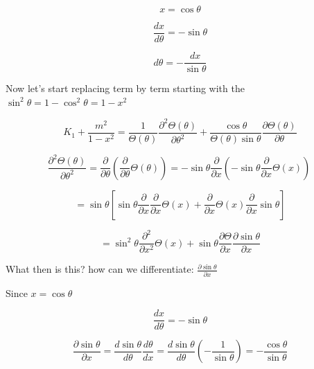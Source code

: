 \documentclass[12pt]{article}
\renewcommand{\_}{\kern-1.5pt\textunderscore\kern-1.5pt}
\begin{document}
 \[ x=\cos  \theta  \] \par

 \[ \frac{dx}{d \theta }=-\sin  \theta  \] \par

 \[ d \theta =-\frac{dx}{\sin  \theta } \] \par

Now let’s start replacing term by term starting with the  \( \sin ^{2} \theta =1-\cos ^{2} \theta =1-x^{2} \) \par

 \[ K_{1}+\frac{m^{2}}{1-x^{2}}=\frac{1}{ \Theta  \left(  \theta  \right) }\frac{ \partial ^{2} \Theta  \left(  \theta  \right) }{ \partial  \theta ^{2}}+\frac{\cos  \theta }{ \Theta  \left(  \theta  \right) \sin  \theta }\frac{ \partial  \Theta  \left(  \theta  \right) }{ \partial  \theta } \] \par


\vspace{\baselineskip}
 \[ \frac{ \partial ^{2} \Theta  \left(  \theta  \right) }{ \partial  \theta ^{2}}=\frac{ \partial }{ \partial  \theta } \left( \frac{ \partial }{ \partial  \theta } \Theta  \left(  \theta  \right)  \right) =-\sin  \theta \frac{ \partial }{ \partial x} \left( -\sin  \theta \frac{ \partial }{ \partial x} \Theta  \left( x \right)  \right) ~ \] \par

 \[ =\sin  \theta  \left[ \sin  \theta \frac{ \partial }{ \partial x}\frac{ \partial }{ \partial x} \Theta  \left( x \right) +\frac{ \partial }{ \partial x} \Theta  \left( x \right) \frac{ \partial }{ \partial x}\sin  \theta  \right]  \] \par

 \[ =\sin ^{2} \theta \frac{ \partial ^{2}}{ \partial x^{2}} \Theta  \left( x \right) +\sin  \theta \frac{ \partial  \Theta }{ \partial x}\frac{ \partial \sin  \theta }{ \partial x} \] \par

What then is this? how can we differentiate:  \( \frac{ \partial \sin  \theta }{ \partial x} \) \par

Since  \( x=\cos  \theta  \) \par

 \[ \frac{dx}{d \theta }=-\sin  \theta  \] \par

 \[ \frac{ \partial \sin  \theta }{ \partial x}=\frac{d\sin  \theta }{d \theta }\frac{d \theta }{dx}=\frac{d\sin  \theta }{d \theta } \left( -\frac{1}{\sin  \theta } \right) =-\frac{\cos  \theta }{\sin  \theta } \] \par
\end{document}
